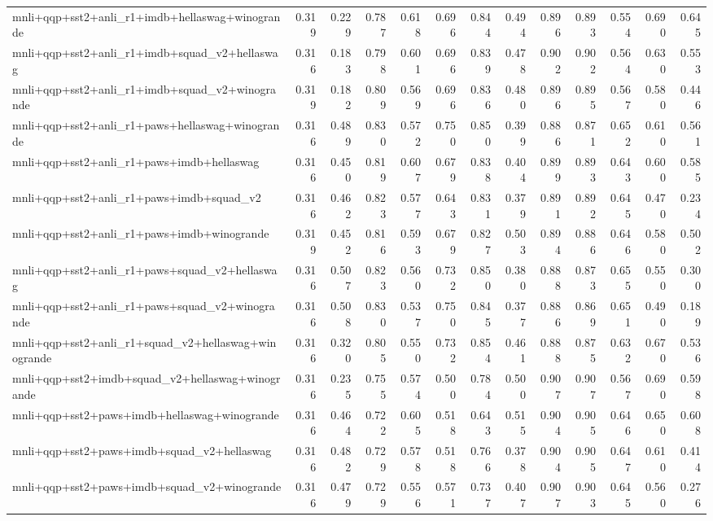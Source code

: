 \begin{table}[t]
\begin{tabular}{lrrrrrrrrrrrr}
    mnli+qqp+sst2+anli\_r1+imdb+hellaswag+winogrande & 0.319 & 0.229 & 0.787 & 0.618 & 0.696 & 0.844 & 0.494 & 0.896 & 0.893 & 0.554 & 0.690 & 0.645 \\
    mnli+qqp+sst2+anli\_r1+imdb+squad\_v2+hellaswag & 0.316 & 0.183 & 0.798 & 0.601 & 0.696 & 0.839 & 0.478 & 0.902 & 0.902 & 0.564 & 0.630 & 0.553 \\
    mnli+qqp+sst2+anli\_r1+imdb+squad\_v2+winogrande & 0.319 & 0.182 & 0.809 & 0.569 & 0.696 & 0.836 & 0.480 & 0.896 & 0.895 & 0.567 & 0.580 & 0.446 \\
    mnli+qqp+sst2+anli\_r1+paws+hellaswag+winogrande & 0.316 & 0.489 & 0.830 & 0.572 & 0.750 & 0.850 & 0.399 & 0.886 & 0.871 & 0.652 & 0.610 & 0.561 \\
    mnli+qqp+sst2+anli\_r1+paws+imdb+hellaswag & 0.316 & 0.450 & 0.819 & 0.607 & 0.679 & 0.838 & 0.404 & 0.899 & 0.893 & 0.643 & 0.600 & 0.585 \\
    mnli+qqp+sst2+anli\_r1+paws+imdb+squad\_v2 & 0.316 & 0.462 & 0.823 & 0.577 & 0.643 & 0.831 & 0.379 & 0.891 & 0.892 & 0.645 & 0.470 & 0.234 \\
    mnli+qqp+sst2+anli\_r1+paws+imdb+winogrande & 0.319 & 0.452 & 0.816 & 0.593 & 0.679 & 0.827 & 0.503 & 0.894 & 0.886 & 0.646 & 0.580 & 0.502 \\
    mnli+qqp+sst2+anli\_r1+paws+squad\_v2+hellaswag & 0.316 & 0.507 & 0.823 & 0.560 & 0.732 & 0.850 & 0.380 & 0.888 & 0.873 & 0.655 & 0.550 & 0.300 \\
    mnli+qqp+sst2+anli\_r1+paws+squad\_v2+winogrande & 0.316 & 0.508 & 0.830 & 0.537 & 0.750 & 0.845 & 0.377 & 0.886 & 0.869 & 0.651 & 0.490 & 0.189 \\
    mnli+qqp+sst2+anli\_r1+squad\_v2+hellaswag+winogrande & 0.316 & 0.320 & 0.805 & 0.550 & 0.732 & 0.854 & 0.461 & 0.888 & 0.875 & 0.632 & 0.670 & 0.536 \\
    mnli+qqp+sst2+imdb+squad\_v2+hellaswag+winogrande & 0.316 & 0.235 & 0.755 & 0.574 & 0.500 & 0.784 & 0.500 & 0.907 & 0.907 & 0.567 & 0.690 & 0.598 \\
    mnli+qqp+sst2+paws+imdb+hellaswag+winogrande & 0.316 & 0.464 & 0.722 & 0.605 & 0.518 & 0.643 & 0.515 & 0.904 & 0.905 & 0.646 & 0.650 & 0.608 \\
    mnli+qqp+sst2+paws+imdb+squad\_v2+hellaswag & 0.316 & 0.482 & 0.729 & 0.578 & 0.518 & 0.766 & 0.378 & 0.904 & 0.905 & 0.647 & 0.610 & 0.414 \\
    mnli+qqp+sst2+paws+imdb+squad\_v2+winogrande & 0.316 & 0.479 & 0.729 & 0.556 & 0.571 & 0.737 & 0.407 & 0.907 & 0.903 & 0.645 & 0.560 & 0.276 \\

\end{tabular}
\end{table}
